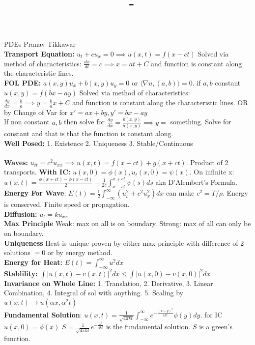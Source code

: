\documentclass[answers,12pt,addpoints]{exam}
\author{\name}
\title{\course \ - \assignment}
\begin{document}
PDEs Pranav Tikkawar\\
\textbf{Transport Equation:} $u_t + cu_x = 0 \implies u(x,t) = f(x-ct)$ Solved via method of characteristics: $\frac{dx}{dt} = c \implies x = at + C$ and function is constant along the characteristic lines.\\ 
\textbf{FOL PDE:} $a(x,y)u_{x} + b(x,y)u_{y} = 0$ or $\langle \nabla u,(a,b)\rangle = 0$. if $a,b$ constant $u(x,y) = f(bx-ay)$ Solved via method of characteristics: $\frac{dy}{dx} = \frac{b}{a} \implies y = \frac{b}{a}x + C$ and function is constant along the characteristic lines. OR by Change of Var for $x' = ax + by, y' = bx - ay$\\
If non constant $a,b$ then solve for $\frac{dy}{dx} = \frac{b(x,y)}{a(x,y)} \implies y = $ something. Solve for constant and that is that the function is constant along.\\
\textbf{Well Posed:} 1. Existence 2. Uniqueness 3. Stable/Continuous \\\\
\textbf{Waves: }$u_{tt} = c^2u_{xx} \implies u(x,t) = f(x-ct) + g(x+ct)$. Product of 2 transports. 
\textbf{With IC:} $u(x,0) = \phi(x), u_t(x,0) = \psi(x)$. On infinite x: $u(x,t) = \frac{\phi(x+ct) - \phi(x-ct)}{2} - \frac{1}{2c} \int_{x-ct}^{x+ct} \psi(s)ds$ aka D'Alembert's Formula.\\
\textbf{Energy For Wave}: $E(t) = \frac{1}{2} \int_{-\infty}^{\infty} (u_t^2 + c^2u_x^2)dx$ can make $c^2 = T/\rho$. Energy is conserved. Finite speed or propagation.\\
\textbf{Diffusion:} $u_t = ku_{xx}$\\
\textbf{Max Principle} Weak: max on all is on boundary. Strong: max of all can only be on boundary.\\
\textbf{Uniqueness} Heat is unique proven by either max principle with difference of 2 solutions $=0$ or by energy method.\\
\textbf{Energy for Heat:} $E(t) = \int_{-\infty}^{\infty} u^2dx$\\
\textbf{Stablility:} $\int |u(x,t) - v(x,t)|^2dx \leq \int |u(x,0) - v(x,0)|^2dx$\\
\textbf{Invariance on Whole Line:} 1. Translation, 2. Derivative, 3. Linear Combination, 4. Integral of sol with anything. 5. Scaling by $u(x,t) \to u(\alpha x, \alpha^2 t)$\\
\textbf{Fundamental Solution}: $u(x,t) = \frac{1}{\sqrt{4\pi kt}} \int_{-\infty}^{\infty} e^{-\frac{(x-y)^2}{4kt}}\phi(y)dy$. for IC $u(x,0)= \phi(x)$ $S = \frac{1}{\sqrt{4\pi kt}} e^{-\frac{x^2}{4kt}}$ is the fundamental solution. $S$ is a green's function.\\\\
\end{document}
